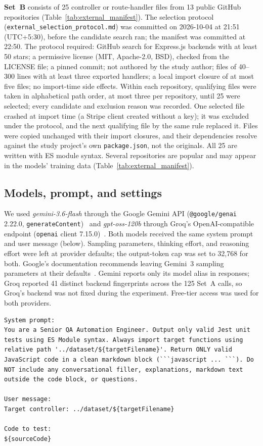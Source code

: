 \documentclass[sigconf]{acmart}
\begin{document}
\textbf{Set~B} consists of 25 controller or route-handler files from 13 public GitHub repositories (Table~\ref{tab:external_manifest}). The selection protocol (\texttt{external\_selection\_protocol.md}) was committed on 2026-10-04 at 21:51 (UTC+5:30), before the candidate search ran; the manifest was committed at 22:50. The protocol required: GitHub search for Express.js backends with at least 50 stars; a permissive license (MIT, Apache-2.0, BSD), checked from the LICENSE file; a pinned commit; not authored by the study author; files of 40--300 lines with at least three exported handlers; a local import closure of at most five files; no import-time side effects. Within each repository, qualifying files were taken in alphabetical path order, at most three per repository, until 25 were selected; every candidate and exclusion reason was recorded. One selected file crashed at import time (a Stripe client created without a key); it was excluded under the protocol, and the next qualifying file by the same rule replaced it. Files were copied unchanged with their import closures, and their dependencies resolve against the study project's own \texttt{package.json}, not the originals. All 25 are written with ES module syntax. Several repositories are popular and may appear in the models' training data (Table~\ref{tab:external_manifest}).

\subsection{Models, prompt, and settings}
We used \textit{gemini-3.6-flash} through the Google Gemini API (\texttt{@google/genai} 2.22.0, \texttt{generateContent})~\cite{google2026gemini36} and \textit{gpt-oss-120b} through Groq's OpenAI-compatible endpoint (\texttt{openai} client 7.15.0)~\cite{openai2025gptoss}. Both models received the same system prompt and user message (below). Sampling parameters, thinking effort, and reasoning effort were left at provider defaults; the output-token cap was set to 32{,}768 for both. Google's documentation recommends leaving Gemini~3 sampling parameters at their defaults~\cite{google2026gemini36}. Gemini reports only its model alias in responses; Groq reported 41 distinct backend fingerprints across the 125 Set~A calls, so Groq's backend was not fixed during the experiment. Free-tier access was used for both providers.

\begin{lstlisting}
System prompt:
You are a Senior QA Automation Engineer. Output only valid Jest unit tests using ES Module syntax. Always import target functions using relative path '../dataset/${targetFilename}'. Return ONLY valid JavaScript code in a clean markdown block (```javascript ... ```). Do NOT include any conversational filler, explanations, markdown text outside the code block, or questions.

User message:
Target controller: ../dataset/${targetFilename}

Code to test:
${sourceCode}
\end{lstlisting}
\end{document}
